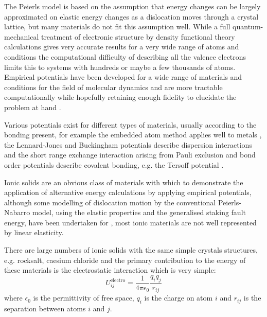


The Peierls model is based on the assumption that energy changes can be largely approximated on elastic energy changes as a dislocation moves through a crystal lattice, but many materials do not fit this assumption well. While a full quantum-mechanical treatment of electronic structure by density functional theory calculations gives very accurate results for a very wide range of atoms and conditions the computational difficulty of describing all the valence electrons limits this to systems with hundreds or maybe a few thousands of atoms. Empirical potentials have been developed for a wide range of materials and conditions for the field of molecular dynamics and are more tractable computationally while hopefully retaining enough fidelity to elucidate the problem at hand \cite{martinez2013}.

Various potentials exist for different types of materials, usually according to the bonding present, for example the embedded atom method applies well to metals \cite{Daw1984}, the Lennard-Jones  and Buckingham potentials describe dispersion interactions and the short range exchange interaction arising from Pauli exclusion \cite{Jones1924,Buckingham1938} and bond order potentials describe covalent bonding, e.g. the Tersoff potential \cite{Tersoff1988}. 


Ionic solids are an obvious class of materials with which to demonstrate the application of alternative energy calculations by applying empirical potentials, although some modelling of dislocation motion by the conventional Peierls-Nabarro model, using the elastic properties and the generalised staking fault energy, have been undertaken for  \cite{Miranda2005}, most ionic materials are not well represented by linear elasticity. 

There are large numbers of ionic solids with the same simple crystals structures, e.g. rocksalt, caesium chloride \cite{Kelly2012app7} and the primary contribution to the energy of these materials is the electrostatic interaction which is very simple:
\begin{equation}
U^{\text{electro}}_{ij} = \frac{1}{4\pi\epsilon_0} \frac{q_i q_j}{r_{ij}}
\end{equation}
where $\epsilon_0$ is the permittivity of free space, $q_i$ is the charge on atom $i$ and $r_{ij}$ is the separation between atoms $i$ and $j$.


